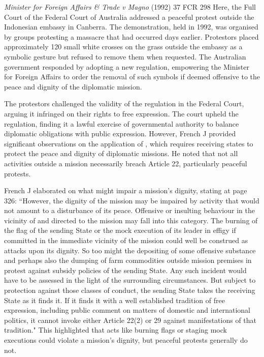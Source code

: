 \begin{casedetails}{\textit{Minister for Foreign Affairs \& Trade v Magno} (1992) 37 FCR 298}
    \flushleft
    Here, the Full Court of the Federal Court of Australia addressed a peaceful protest outside the Indonesian embassy in Canberra. The demonstration, held in 1992, was organised by groups protesting a massacre that had occurred days earlier. Protestors placed approximately 120 small white crosses on the grass outside the embassy as a symbolic gesture but refused to remove them when requested. The Australian government responded by adopting a new regulation, empowering the Minister for Foreign Affairs to order the removal of such symbols if deemed offensive to the peace and dignity of the diplomatic mission.

    \vspace{\baselineskip}

    The protestors challenged the validity of the regulation in the Federal Court, arguing it infringed on their rights to free expression. The court upheld the regulation, finding it a lawful exercise of governmental authority to balance diplomatic obligations with public expression. However, French J provided significant observations on the application of , which requires receiving states to protect the peace and dignity of diplomatic missions. He noted that not all activities outside a mission necessarily breach Article 22, particularly peaceful protests.

    \vspace{\baselineskip}

    French J elaborated on what might impair a mission's dignity, stating at page 326: ``However, the dignity of the mission may be impaired by activity that would not amount to a disturbance of its peace. Offensive or insulting behaviour in the vicinity of and directed to the mission may fall into this category. The burning of the flag of the sending State or the mock execution of its leader in effigy if committed in the immediate vicinity of the mission could well be construed as attacks upon its dignity. So too might the depositing of some offensive substance and perhaps also the dumping of farm commodities outside mission premises in protest against subsidy policies of the sending State. Any such incident would have to be assessed in the light of the surrounding circumstances. But subject to protection against those classes of conduct, the sending State takes the receiving State as it finds it. If it finds it with a well established tradition of free expression, including public comment on matters of domestic and international politics, it cannot invoke either Article 22(2) or 29 against manifestations of that tradition." This highlighted that acts like burning flags or staging mock executions could violate a mission's dignity, but peaceful protests generally do not.


\end{casedetails}
